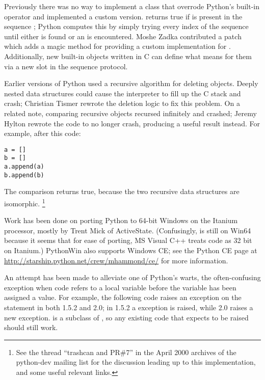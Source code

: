 \documentclass{howto}
\begin{document}
Previously there was no way to implement a class that overrode
Python's built-in  operator and implemented a custom
version.   returns true if  is
present in the sequence ; Python computes this by simply
trying every index of the sequence until either  is found or
an  is encountered.  Moshe Zadka contributed a
patch which adds a  magic method for providing a
custom implementation for . Additionally, new built-in
objects written in C can define what  means for them via a
new slot in the sequence protocol.

Earlier versions of Python used a recursive algorithm for deleting
objects.  Deeply nested data structures could cause the interpreter to
fill up the C stack and crash; Christian Tismer rewrote the deletion
logic to fix this problem.  On a related note, comparing recursive
objects recursed infinitely and crashed; Jeremy Hylton rewrote the
code to no longer crash, producing a useful result instead.  For
example, after this code:

\begin{verbatim}
a = []
b = []
a.append(a)
b.append(b)
\end{verbatim}

The comparison  returns true, because the two recursive
data structures are isomorphic. \footnote{See the thread ``trashcan
and PR\#7'' in the April 2000 archives of the python-dev mailing list
for the discussion leading up to this implementation, and some useful
relevant links.
}

Work has been done on porting Python to 64-bit Windows on the Itanium
processor, mostly by Trent Mick of ActiveState.  (Confusingly,
 is still  on Win64 because it seems
that for ease of porting, MS Visual C++ treats code as 32 bit on Itanium.)
PythonWin also supports Windows CE; see the Python CE page at
\url{http://starship.python.net/crew/mhammond/ce/} for more
information.

An attempt has been made to alleviate one of Python's warts, the
often-confusing  exception when code refers to a
local variable before the variable has been assigned a value.  For
example, the following code raises an exception on the 
statement in both 1.5.2 and 2.0; in 1.5.2 a 
exception is raised, while 2.0 raises a new
 exception.
 is a subclass of ,
so any existing code that expects  to be raised
should still work.
\end{document}
